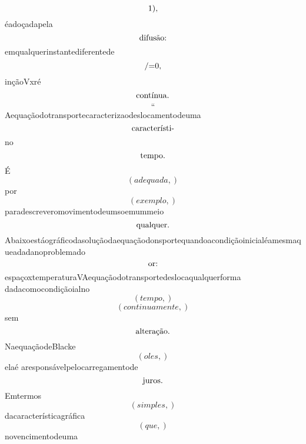 \documentclass{article}
\begin{document}
\begin{equation}
$1),$
\end{equation}éadoçadapela\begin{equation}
$difusão:$
\end{equation}emqualquerinstantediferentede\begin{equation}
$/=0,$
\end{equation}inçãoVxré\begin{equation}
$contínua.$
\end{equation}\begin{equation}
“
\end{equation}Aequaçãodotransportecaracterizaodeslocamentodeuma\begin{equation}
$característi-$
\end{equation}no\begin{equation}
$tempo.$
\end{equation}É\begin{equation}
\left( adequada,\right)
\end{equation}por\begin{equation}
\left( exemplo,\right)
\end{equation}paradescreveromovimentodeumsoemummeio\begin{equation}
$qualquer.$
\end{equation}Abaixoestáográficodasoluçãodaequaçãodonsportequandoacondiçãoinicialéamesmaqueadadanoproblemado\begin{equation}
$or:$
\end{equation}espaçoxtemperaturaVAequaçãodotransportedeslocaqualquerforma dadacomocondiçãoialno\begin{equation}
\left( tempo,\right)
\end{equation}\begin{equation}
\left( continuamente,\right)
\end{equation}sem\begin{equation}
$alteração.$
\end{equation}NaequaçãodeBlacke\begin{equation}
\left( oles,\right)
\end{equation}elaé aresponsávelpelocarregamentode\begin{equation}
$juros.$
\end{equation}Emtermos\begin{equation}
\left( simples,\right)
\end{equation}dacaracterísticagráfica\begin{equation}
\left( que,\right)
\end{equation}novencimentodeuma\begin{equation}

\end{equation}
\end{document}

